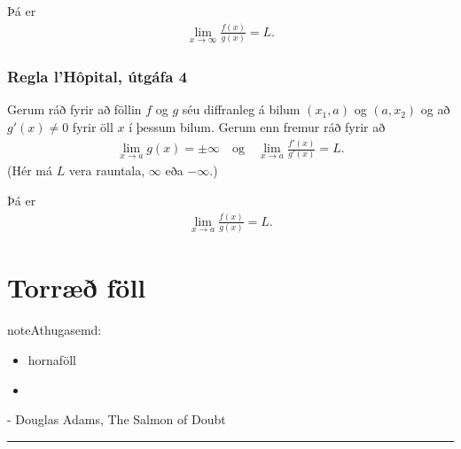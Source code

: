 \documentclass[b5paper,10pt,icelandic]{sphinxmanual}
\begin{document}
Þá er
\begin{equation*}
\begin{split}\lim_{x\rightarrow \infty}\frac{f(x)}{g(x)}=L.\end{split}
\end{equation*}

\subsection{Regla l’Hôpital, útgáfa 4}
\label{\detokenize{kafli03:regla-lhopital-utgafa-4}}
Gerum ráð fyrir að föllin \(f\) og \(g\) séu diffranleg á bilum
\((x_1, a)\) og \((a, x_2)\) og að \(g'(x)\neq 0\) fyrir öll
\(x\) í þessum bilum. Gerum enn fremur ráð fyrir að
\begin{equation*}
\begin{split}\lim_{x\rightarrow a}g(x)=\pm\infty
\quad\mbox{og}\quad \lim_{x\rightarrow a}\frac{f'(x)}{g'(x)}=L.\end{split}
\end{equation*}
(Hér má \(L\) vera rauntala, \(\infty\) eða \(-\infty\).)

Þá er
\begin{equation*}
\begin{split}\lim_{x\rightarrow a}\frac{f(x)}{g(x)}=L.\end{split}
\end{equation*}

\chapter{Torræð föll}
\label{\detokenize{kafli04:torrae-foll}}\label{\detokenize{kafli04::doc}}
\begin{sphinxadmonition}{note}{Athugasemd:}
\begin{itemize}
\item {} 
hornaföll

\item {} 
{\hyperref[\detokenize{kafli01:andhverfa}]{}}

\end{itemize}
\end{sphinxadmonition}


- Douglas Adams, The Salmon of Doubt


\bigskip\hrule\bigskip
\end{document}
